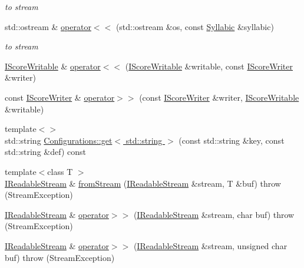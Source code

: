 \begin{DoxyCompactItemize}
\begin{DoxyCompactList}\small\item\em to stream \end{DoxyCompactList}\item 
\hypertarget{namespacesinsy_a673b7535b8306c6edfffe7fd8ab3e1fe}{std\-::ostream \& \hyperlink{namespacesinsy_a673b7535b8306c6edfffe7fd8ab3e1fe}{operator$<$$<$} (std\-::ostream \&os, const \hyperlink{classsinsy_1_1Syllabic}{\-Syllabic} \&syllabic)}\label{namespacesinsy_a673b7535b8306c6edfffe7fd8ab3e1fe}

\begin{DoxyCompactList}\small\item\em to stream \end{DoxyCompactList}\item 
\hyperlink{classsinsy_1_1IScoreWritable}{\-I\-Score\-Writable} \& \hyperlink{namespacesinsy_a200ac35de11767624c2d0ed35969698f}{operator$<$$<$} (\hyperlink{classsinsy_1_1IScoreWritable}{\-I\-Score\-Writable} \&writable, const \hyperlink{classsinsy_1_1IScoreWriter}{\-I\-Score\-Writer} \&writer)
\item 
const \hyperlink{classsinsy_1_1IScoreWriter}{\-I\-Score\-Writer} \& \hyperlink{namespacesinsy_a3a9823d2e3d2eb318b8f2d10adb7f015}{operator$>$$>$} (const \hyperlink{classsinsy_1_1IScoreWriter}{\-I\-Score\-Writer} \&writer, \hyperlink{classsinsy_1_1IScoreWritable}{\-I\-Score\-Writable} \&writable)
\item 
{\footnotesize template$<$$>$ }\\std\-::string \hyperlink{namespacesinsy_a9bef46e253dd2982d5fce27c4ae07329}{\-Configurations\-::get$<$ std\-::string $>$} (const std\-::string \&key, const std\-::string \&def) const 
\item 
{\footnotesize template$<$class T $>$ }\\\hyperlink{classsinsy_1_1IReadableStream}{\-I\-Readable\-Stream} \& \hyperlink{namespacesinsy_a86eb8eb0d21024352892e2c457a9f297}{from\-Stream} (\hyperlink{classsinsy_1_1IReadableStream}{\-I\-Readable\-Stream} \&stream, \-T \&buf)  throw (\-Stream\-Exception)
\item 
\hyperlink{classsinsy_1_1IReadableStream}{\-I\-Readable\-Stream} \& \hyperlink{namespacesinsy_aba01c449441e1653803e6001751ab5cf}{operator$>$$>$} (\hyperlink{classsinsy_1_1IReadableStream}{\-I\-Readable\-Stream} \&stream, char buf)  throw (\-Stream\-Exception)
\item 
\hyperlink{classsinsy_1_1IReadableStream}{\-I\-Readable\-Stream} \& \hyperlink{namespacesinsy_a06320d12903c0e87b2be140a5db155c2}{operator$>$$>$} (\hyperlink{classsinsy_1_1IReadableStream}{\-I\-Readable\-Stream} \&stream, unsigned char buf)  throw (\-Stream\-Exception)

\end{DoxyCompactItemize}
